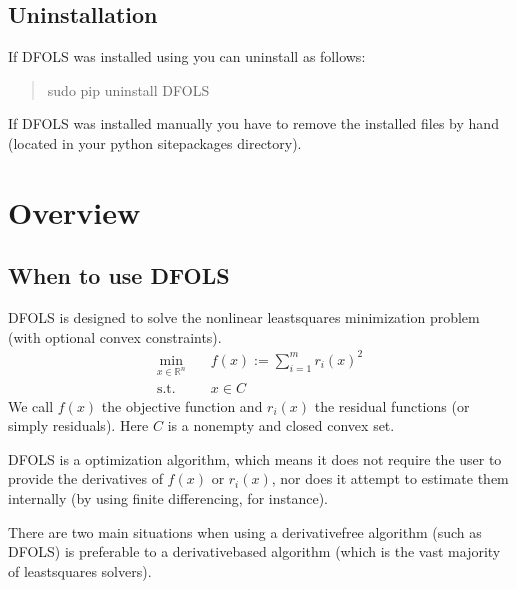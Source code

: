 \documentclass[letterpaper,10pt,english]{sphinxmanual}
\begin{document}
\section{Uninstallation}
\label{\detokenize{install:uninstallation}}
If DFO\sphinxhyphen{}LS was installed using  you can uninstall as follows:
\begin{quote}

\begin{sphinxVerbatim}[commandchars=\\\{\}]
\PYGZdl{} \PYG{o}{[}sudo\PYG{o}{]} pip uninstall DFO\PYGZhy{}LS
\end{sphinxVerbatim}
\end{quote}

If DFO\sphinxhyphen{}LS was installed manually you have to remove the installed files by hand (located in your python site\sphinxhyphen{}packages directory).


\chapter{Overview}
\label{\detokenize{info:overview}}\label{\detokenize{info::doc}}

\section{When to use DFO\sphinxhyphen{}LS}
\label{\detokenize{info:when-to-use-dfo-ls}}
DFO\sphinxhyphen{}LS is designed to solve the nonlinear least\sphinxhyphen{}squares minimization problem (with optional convex constraints).
\begin{equation*}
\begin{split}\min_{x\in\mathbb{R}^n}  &\quad  f(x) := \sum_{i=1}^{m}r_{i}(x)^2 \\
\text{s.t.} &\quad x \in C\end{split}
\end{equation*}
We call \(f(x)\) the objective function and \(r_i(x)\) the residual functions (or simply residuals).
Here \(C\) is a non\sphinxhyphen{}empty and closed convex set.

DFO\sphinxhyphen{}LS is a  optimization algorithm, which means it does not require the user to provide the derivatives of \(f(x)\) or \(r_i(x)\), nor does it attempt to estimate them internally (by using finite differencing, for instance).

There are two main situations when using a derivative\sphinxhyphen{}free algorithm (such as DFO\sphinxhyphen{}LS) is preferable to a derivative\sphinxhyphen{}based algorithm (which is the vast majority of least\sphinxhyphen{}squares solvers).
\end{document}
